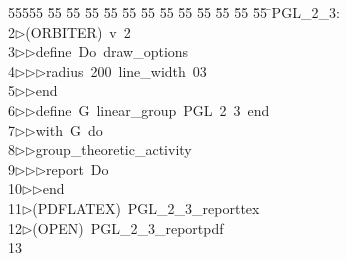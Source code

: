 %
%
\begin{tabbing}
55555 \= 55 \= 55 \= 55 \= 55 \= 55 \= 55 \= 55 \= 55 \= 55 \= 55 \= 55 \= 55 \= \>PGL\_2\_3:\\[0pt]
2\>$\triangleright$\>(ORBITER)\ v\ 2\ \\[0pt]
3\>$\triangleright$\>$\triangleright$\>define\ Do\ draw\_options\ \\[0pt]
4\>$\triangleright$\>$\triangleright$\>$\triangleright$\>radius\ 200\ line\_width\ 03\ \\[0pt]
5\>$\triangleright$\>$\triangleright$\>end\ \\[0pt]
6\>$\triangleright$\>$\triangleright$\>define\ G\ linear\_group\ PGL\ 2\ 3\ end\ \\[0pt]
7\>$\triangleright$\>$\triangleright$\>with\ G\ do\ \\[0pt]
8\>$\triangleright$\>$\triangleright$\>group\_theoretic\_activity\ \\[0pt]
9\>$\triangleright$\>$\triangleright$\>$\triangleright$\>report\ Do\ \\[0pt]
10\>$\triangleright$\>$\triangleright$\>end\\[0pt]
11\>$\triangleright$\>(PDFLATEX)\ PGL\_2\_3\_reporttex\\[0pt]
12\>$\triangleright$\>(OPEN)\ PGL\_2\_3\_reportpdf\\[0pt]
13\>\end{tabbing}
